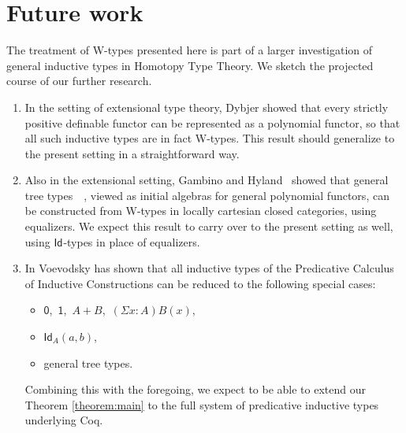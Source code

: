 \documentclass{article}
\newcommand{\Id}{\mathsf{Id}}
\newcommand{\id}[1]{\Id_{#1}}
\newcommand{\List}{\mathsf{List}}
\theoremstyle{remark}
\theoremstyle{definition}
\begin{document}


\section{Future work}\label{section:future}

\noindent The treatment of W-types presented here is part of a larger investigation of general inductive types in Homotopy Type Theory.  We sketch the projected course of our further research.

\begin{enumerate}
\item  In the setting of  extensional type theory, Dybjer \cite{DybjerP:repids} showed that every strictly positive definable functor can be represented as a polynomial functor, so that all such inductive types are in fact W-types.  This result should generalize to the present setting in a straightforward way.

\item Also in the extensional setting, Gambino and Hyland~\cite{GambinoN:weltdp} showed that 
general tree types~\cite{PeterssonK:setcis}~\cite[Chapter~16]{NordstromB:promlt}, viewed as 
initial algebras for general polynomial functors, can be constructed from W-types in
locally cartesian closed categories, using equalizers. We expect this result to carry over to the present setting as well, using $\id{}$-types in place of equalizers.

\item In \cite{VoevodskyV:notts} Voevodsky has shown that all inductive types of the Predicative Calculus of Inductive Constructions can be reduced to the following special cases:
\begin{itemize}
\item $\mathsf{0}$,\ $\mathsf{1}$,\ $A+B$,\  $(\Sigma x : A)B(x)$,
\item $\id{A}(a,b)$,
\item general tree types.
\end{itemize}
Combining this with the foregoing, we expect to be able to extend our Theorem \ref{theorem:main} to the full system of predicative inductive types underlying Coq.
\end{enumerate}
\end{document}
